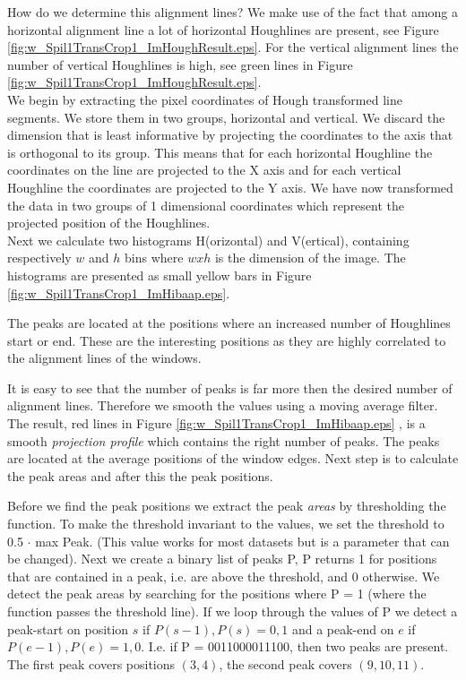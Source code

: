 How do we determine this alignment lines? We make use of the fact that among a
horizontal alignment line a lot of horizontal Houghlines are present, see
Figure \ref{fig:w_Spil1TransCrop1_ImHoughResult.eps}. For the vertical alignment lines
the number of vertical Houghlines is high, see green lines in Figure
\ref{fig:w_Spil1TransCrop1_ImHoughResult.eps}.\\

We begin by extracting the pixel coordinates of Hough transformed line
segments. We store them in two groups, horizontal and vertical.%
We discard the dimension that is least informative by projecting the coordinates to
the axis that is orthogonal to its group. 
This means that for each horizontal Houghline the coordinates on the line are projected to the X
axis and for each vertical Houghline the coordinates are projected to the Y
axis. We have now transformed the data in two groups of 1 dimensional
coordinates which represent the projected position of the Houghlines.\\

Next we calculate two histograms H(orizontal) and V(ertical), containing respectively
$w$ and $h$ bins where $w x h$ is the dimension of the image.  The histograms
are presented as small yellow bars in Figure \ref{fig:w_Spil1TransCrop1_ImHibaap.eps}.

The peaks are located at the positions where an increased number of Houghlines
start or end.  These are the interesting positions as they are highly correlated
to the alignment lines of the windows. 

It is easy to see that the number of peaks is far more then the desired number of alignment lines.
Therefore we smooth the values using a moving average filter.
The result, red lines in Figure \ref{fig:w_Spil1TransCrop1_ImHibaap.eps}
, is a smooth \emph{projection profile} which contains the right number of peaks. The peaks
are located at the average positions of the window edges. Next step is to
calculate the peak areas and after this the peak positions. 

Before we find the peak positions we extract the peak \emph{areas} by thresholding the
function. To make the threshold invariant to the values, we set the threshold to 0.5 $\cdot$ max Peak. 
(This value works for most datasets but is a parameter that can be changed).
Next we create a binary list of peaks P, P returns 1 for positions that are contained in
a peak, i.e. are above the threshold, and 0 otherwise.
We detect the peak areas by searching for the positions where P = 1
(where the function passes the threshold line). 
If we loop through the values of P we detect a peak-start on position $s$ if ${P(s-1),P(s)}={0,1}$
and a peak-end on $e$ if ${P(e-1),P(e)}={1,0}$. 
I.e. if P = 0011000011100, then two peaks are present. The first peak covers positions $(3,4)$, 
the second peak covers $(9,10,11)$.\\

